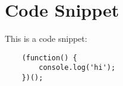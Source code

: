 \section{Code Snippet}

This is a code snippet:

\begin{verbatim}
    (function() {
        console.log('hi');
    })();
\end{verbatim}